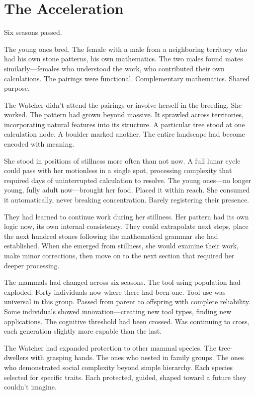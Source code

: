 \chapter{The Acceleration}
\label{ch:08}


Six seasons passed.

The young ones bred. The female with a male from a neighboring territory who had his own stone patterns, his own mathematics. The two males found mates similarly—females who understood the work, who contributed their own calculations. The pairings were functional. Complementary mathematics. Shared purpose.

The Watcher didn't attend the pairings or involve herself in the breeding. She worked. The pattern had grown beyond massive. It sprawled across territories, incorporating natural features into its structure. A particular tree stood at one calculation node. A boulder marked another. The entire landscape had become encoded with meaning.

She stood in positions of stillness more often than not now. A full lunar cycle could pass with her motionless in a single spot, processing complexity that required days of uninterrupted calculation to resolve. The young ones—no longer young, fully adult now—brought her food. Placed it within reach. She consumed it automatically, never breaking concentration. Barely registering their presence.

They had learned to continue work during her stillness. Her pattern had its own logic now, its own internal consistency. They could extrapolate next steps, place the next hundred stones following the mathematical grammar she had established. When she emerged from stillness, she would examine their work, make minor corrections, then move on to the next section that required her deeper processing.

The mammals had changed across six seasons. The tool-using population had exploded. Forty individuals now where there had been one. Tool use was universal in this group. Passed from parent to offspring with complete reliability. Some individuals showed innovation—creating new tool types, finding new applications. The cognitive threshold had been crossed. Was continuing to cross, each generation slightly more capable than the last.

The Watcher had expanded protection to other mammal species. The tree-dwellers with grasping hands. The ones who nested in family groups. The ones who demonstrated social complexity beyond simple hierarchy. Each species selected for specific traits. Each protected, guided, shaped toward a future they couldn't imagine.

